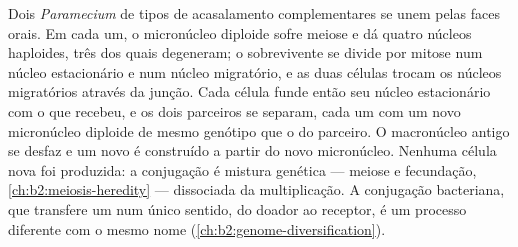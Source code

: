 \begin{proposition}\label{prop:b2:unicellular-diversity:conjugation}
Dois \emph{Paramecium} de tipos de acasalamento complementares se unem
pelas faces orais. Em cada um, o micronúcleo diploide sofre meiose e
dá quatro núcleos haploides, três dos quais degeneram; o sobrevivente
se divide por mitose num núcleo estacionário e num núcleo migratório,
e as duas células trocam os núcleos migratórios através da junção.
Cada célula funde então seu núcleo estacionário com o que recebeu, e
os dois parceiros se separam, cada um com um novo micronúcleo diploide
de mesmo genótipo que o do parceiro. O macronúcleo antigo se desfaz e
um novo é construído a partir do novo micronúcleo. Nenhuma célula nova
foi produzida: a conjugação é mistura genética --- meiose e
fecundação, \cref{ch:b2:meiosis-heredity} --- dissociada da multiplicação. A conjugação
bacteriana, que transfere um  num único sentido, do doador
ao receptor, é um processo diferente com o mesmo nome
(\cref{ch:b2:genome-diversification}).
\end{proposition}

